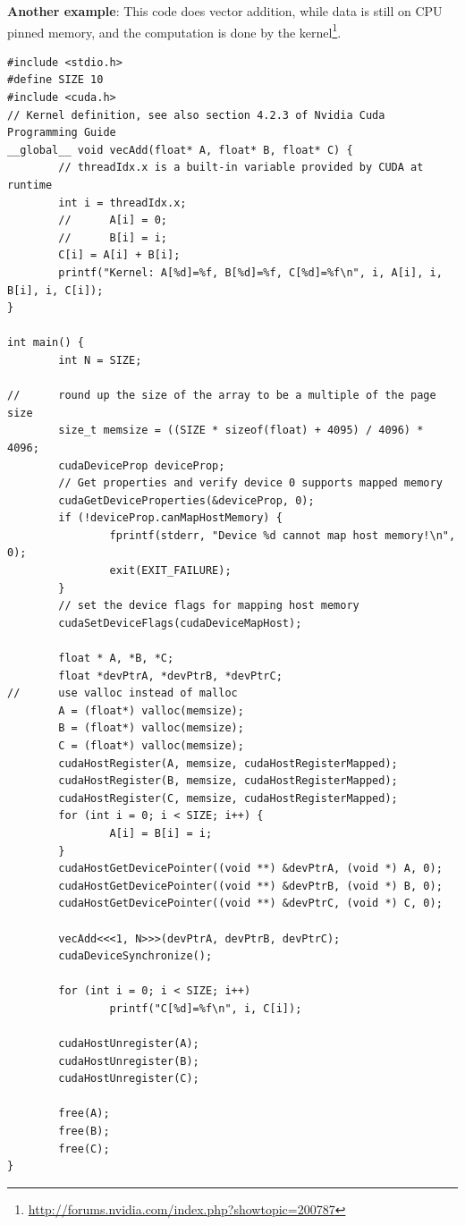 {\bf Another example}: This code does vector addition, while data is still on
CPU pinned memory, and the computation is done by the
kernel\footnote{\url{http://forums.nvidia.com/index.php?showtopic=200787}}.
\begin{lstlisting}
#include <stdio.h>
#define SIZE 10
#include <cuda.h>
// Kernel definition, see also section 4.2.3 of Nvidia Cuda Programming Guide
__global__ void vecAdd(float* A, float* B, float* C) {
        // threadIdx.x is a built-in variable provided by CUDA at runtime
        int i = threadIdx.x;
        //      A[i] = 0;
        //      B[i] = i;
        C[i] = A[i] + B[i];
        printf("Kernel: A[%d]=%f, B[%d]=%f, C[%d]=%f\n", i, A[i], i, B[i], i, C[i]);
}

int main() {
        int N = SIZE;

//      round up the size of the array to be a multiple of the page size
        size_t memsize = ((SIZE * sizeof(float) + 4095) / 4096) * 4096;
        cudaDeviceProp deviceProp;
        // Get properties and verify device 0 supports mapped memory
        cudaGetDeviceProperties(&deviceProp, 0);
        if (!deviceProp.canMapHostMemory) {
                fprintf(stderr, "Device %d cannot map host memory!\n", 0);
                exit(EXIT_FAILURE);
        }
        // set the device flags for mapping host memory
        cudaSetDeviceFlags(cudaDeviceMapHost);

        float * A, *B, *C;
        float *devPtrA, *devPtrB, *devPtrC;
//      use valloc instead of malloc
        A = (float*) valloc(memsize);
        B = (float*) valloc(memsize);
        C = (float*) valloc(memsize);
        cudaHostRegister(A, memsize, cudaHostRegisterMapped);
        cudaHostRegister(B, memsize, cudaHostRegisterMapped);
        cudaHostRegister(C, memsize, cudaHostRegisterMapped);
        for (int i = 0; i < SIZE; i++) {
                A[i] = B[i] = i;
        }
        cudaHostGetDevicePointer((void **) &devPtrA, (void *) A, 0);
        cudaHostGetDevicePointer((void **) &devPtrB, (void *) B, 0);
        cudaHostGetDevicePointer((void **) &devPtrC, (void *) C, 0);

        vecAdd<<<1, N>>>(devPtrA, devPtrB, devPtrC);
        cudaDeviceSynchronize();

        for (int i = 0; i < SIZE; i++)
                printf("C[%d]=%f\n", i, C[i]);

        cudaHostUnregister(A);
        cudaHostUnregister(B);
        cudaHostUnregister(C);

        free(A);
        free(B);
        free(C);
}
\end{lstlisting}


